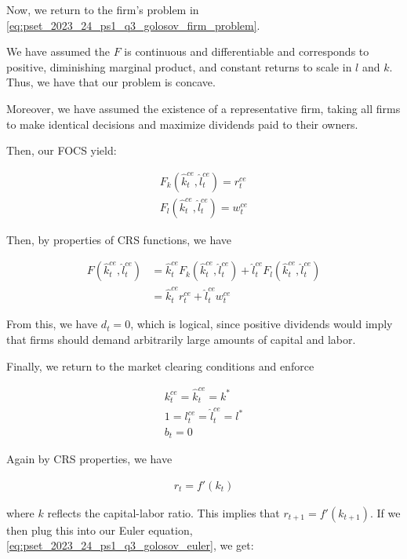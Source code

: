 Now, we return to the firm's problem in \eqref{eq:pset_2023_24_ps1_q3_golosov_firm_problem}. 

We have assumed the $F$ is continuous and differentiable
and corresponds to positive, diminishing marginal product,
and constant returns to scale in $l$ and $k$. 
Thus, we have that our problem is concave.

Moreover, we have assumed the existence of a representative firm, taking 
all firms to make identical decisions and maximize dividends paid 
to their owners.

Then, our FOCS yield:

\begin{align}
    F_k(\hat{k}_t^{ce}, \hat{l}_t^{ce}) = r_t^{ce} \label{eq:pset_2023_24_ps1_q3_golosov_firm_foc1} \\
    F_l(\hat{k}_t^{ce}, \hat{l}_t^{ce}) = w_t^{ce} \label{eq:pset_2023_24_ps1_q3_golosov_firm_foc2}
\end{align}

Then, by properties of CRS functions, we have 

\begin{align}
    F(\hat{k}_t^{ce}, \hat{l}_t^{ce}) &= \hat{k}_t^{ce}F_k(\hat{k}_t^{ce}, \hat{l}_t^{ce}) + \hat{l}_t^{ce}F_l(\hat{k}_t^{ce}, \hat{l}_t^{ce}) \\
    &= \hat{k}_t^{ce}r_t^{ce} + \hat{l}_t^{ce}w_t^{ce} \label{eq:pset_2023_24_ps1_q3_golosov_firm_foc3}
\end{align}

From this, we have $d_t = 0$, which is logical, since 
positive dividends would imply that firms should demand 
arbitrarily large amounts of capital and labor.

Finally, we return to the market clearing conditions and enforce

\begin{align}
    k_t^{ce} = \hat{k}_t^{ce} = k^* \\
    1 = l_t^{ce} = \hat{l}_t^{ce} = l^* \\
    b_t = 0
\end{align}

Again by CRS properties, we have 

\begin{align}
    r_t = f'(k_t)
\end{align}

where $k$ reflects the capital-labor ratio. This implies 
that $r_{t+1} = f'(k_{t+1})$. If we then plug this into our 
Euler equation, \eqref{eq:pset_2023_24_ps1_q3_golosov_euler}, we get:

